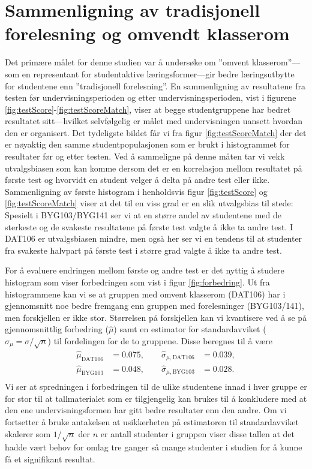 \documentclass[a4paper,norsk,12pt]{report}
\begin{document}
\section{Sammenligning av tradisjonell forelesning og omvendt klasserom}
Det primære målet for denne studien var å undersøke om ''omvent klasserom''---som en representant for studentaktive læringsformer---gir bedre læringsutbytte for studentene enn ''tradisjonell forelesning''. En sammenligning av resultatene fra testen før undervisningsperioden og etter undervisningsperioden, vist i figurene \ref{fig:testScore}-\ref{fig:testScoreMatch}, viser at begge studentgruppene har bedret resultatet sitt---hvilket selvfølgelig er målet med undervisningen uansett hvordan den er organisert. Det tydeligste bildet får vi fra figur \ref{fig:testScoreMatch} der det er nøyaktig den samme studentpopulasjonen som er brukt i histogrammet for resultater før og etter testen. Ved å sammeligne på denne måten tar vi vekk utvalgsbiasen som kan komme dersom det er en korrelasjon mellom resultatet på første test og hvorvidt en student velger å delta på andre test eller ikke. Sammenligning av første histogram i henholdsvis figur \ref{fig:testScore} og \ref{fig:testScoreMatch} viser at det til en viss grad er en slik utvalgsbias til stede: Spesielt i BYG103/BYG141 ser vi at en større andel av studentene med de sterkeste og de svakeste resultatene på første test valgte å ikke ta andre test. I DAT106 er utvalgsbiasen mindre, men også her ser vi en tendens til at studenter fra svakeste halvpart på første test i større grad valgte å ikke ta andre test. 

For å evaluere endringen mellom første og andre test er det nyttig å studere histogram som viser forbedringen som vist i figur \ref{fig:forbedring}. Ut fra histogrammene kan vi se at gruppen med omvent klasserom (DAT106) har i gjennomsnitt noe bedre fremgang enn gruppen med forelesninger (BYG103/141), men forskjellen er ikke stor. Størrelsen på forskjellen kan vi kvantisere ved å se på gjennomsnittlig forbedring ($\hat{\mu}$) samt en estimator for standardavviket ($\hat{\sigma}_\mu = \sigma/\sqrt{n}$) til fordelingen for de to gruppene. Disse beregnes til å være
\begin{displaymath}
\begin{aligned}
	\hat{\mu}_\text{DAT106} &= 0.075,\quad\quad \hat{\sigma}_{\mu,\text{DAT106}} &= 0.039, \\
	\hat{\mu}_\text{BYG103} &= 0.048,\quad\quad \hat{\sigma}_{\mu,\text{BYG103}} &= 0.028. \\
\end{aligned}
\end{displaymath}
Vi ser at spredningen i forbedringen til de ulike studentene innad i hver gruppe er for stor til at tallmaterialet som er tilgjengelig kan brukes til å konkludere med at den ene undervisningsformen har gitt bedre resultater enn den andre. Om vi fortsetter å bruke antakelsen at usikkerheten på estimatoren til standardavviket skalerer som $1/\sqrt{n}$ der $n$ er antall studenter i gruppen viser disse tallen at det hadde vært behov for omlag tre ganger så mange studenter i studien for å kunne få et signifikant resultat.
\end{document}
